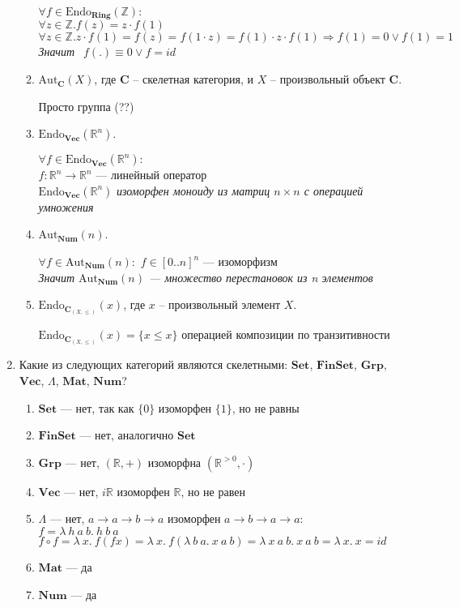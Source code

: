 \documentclass[draft]{article}
\newcommand{\cat}[1]{\mathbf{#1}}
\renewcommand{\C}{\cat{C}}
\newcommand{\Set}{\cat{Set}}
\newcommand{\FinSet}{\cat{FinSet}}
\newcommand{\Grp}{\cat{Grp}}
\renewcommand{\Vec}{\cat{Vec}}
\newcommand{\Mat}{\cat{Mat}}
\newcommand{\Num}{\cat{Num}}
\newcommand{\fs}[1]{\mathrm{#1}}
\begin{document}
\begin{enumerate}
\begin{enumerate}
$\forall f \in \fs{Endo}_\cat{Ring}(\mathbb{Z}):$\\
$\forall z\in\mathbb{Z}. f(z) = z\cdot f(1)$\\
$\forall z\in\mathbb{Z}. z\cdot f(1) = f(z) = f(1 \cdot z) = f(1)\cdot z\cdot f(1) \Rightarrow f(1) = 0 \lor f(1) = 1$\\
\textit{Значит} $~~f(.) \equiv 0 \lor f = id$

\item $\fs{Aut}_\C(X)$, где $\C$ -- скелетная категория, и $X$ -- произвольный объект $\C$.

Просто группа (??)

\item $\fs{Endo}_\Vec(\mathbb{R}^n)$.

$\forall f \in \fs{Endo}_\Vec(\mathbb{R}^n):$\\
$f : \mathbb{R}^n \to \mathbb{R}^n$ --- линейный оператор\\
$\fs{Endo}_\Vec(\mathbb{R}^n)$ \textit{ изоморфен моноиду из матриц $n \times n$ с операцией умножения}

\item $\fs{Aut}_\Num(n)$.

$\forall f \in \fs{Aut}_\Num(n):$
$f \in [0 .. n]^n$ --- изоморфизм\\
\textit{Значит $\fs{Aut}_\Num(n)$ --- множество перестановок из n элементов}

\item $\fs{Endo}_{\C_{(X,\leq)}}(x)$, где $x$ -- произвольный элемент $X$.

$\fs{Endo}_{\C_{(X,\leq)}}(x) = \lbrace x \leq x \rbrace$ операцией композиции по транзитивности

\end{enumerate}

\item Какие из следующих категорий являются скелетными: $\Set$, $\FinSet$, $\Grp$, $\Vec$, $\Lambda$, $\Mat$, $\Num$?

\begin{enumerate}
\item $\Set$ --- нет, так как $\lbrace 0 \rbrace$ изоморфен $\lbrace 1 \rbrace$, но не равны
\item $\FinSet$ --- нет, аналогично $\Set$
\item $\Grp$ --- нет, $(\mathbb{R}, +)$ изоморфна $(\mathbb{R}^{> 0}, \cdot)$
\item $\Vec$ --- нет, $i\mathbb{R}$ изоморфен $\mathbb{R}$, но не равен
\item $\Lambda$ --- нет, $a \to a \to b \to a$ изоморфен $a \to b \to a \to a$:\\
$f = \lambda~h~a~b.~h~b~a$\\
$f \circ f = \lambda~x.~f(f x) = \lambda~x.~f(\lambda~b~a.~x~a~b)= \lambda~x~a~b.~x~a~b = \lambda~x.~x = id$
\item $\Mat$ --- да
\item $\Num$ --- да
\end{enumerate}


\end{enumerate}
\end{document}

